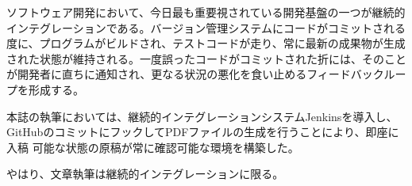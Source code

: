 ソフトウェア開発において、今日最も重要視されている開発基盤の一つが継続的
インテグレーションである。バージョン管理システムにコードがコミットされる
度に、プログラムがビルドされ、テストコードが走り、常に最新の成果物が生成
された状態が維持される。一度誤ったコードがコミットされた折には、そのこと
が開発者に直ちに通知され、更なる状況の悪化を食い止めるフィードバックルー
プを形成する。


本誌の執筆においては、継続的インテグレーションシステムJenkinsを導入し、
GitHubのコミットにフックしてPDFファイルの生成を行うことにより、即座に入稿
可能な状態の原稿が常に確認可能な環境を構築した。

やはり、文章執筆は継続的インテグレーションに限る。
